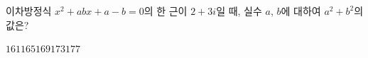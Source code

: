 이차방정식 $x^2+abx+a-b=0$의 한 근이 $2+3i$일 때, 실수 $a$, $b$에 대하여 $a^2+b^2$의 값은?
\begin{choices32}{$161$}{$165$}{$169$}{$173$}{$177$}\end{choices32}
